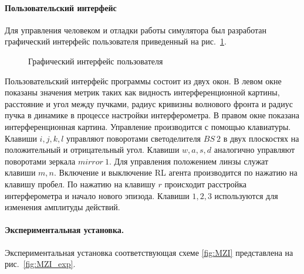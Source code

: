 \paragraph{Пользовательский интерфейс}

Для управления человеком и отладки работы симулятора был разработан графический интерфейс пользователя приведенный на рис.~\ref{fig:gui}. 

\begin{figure}[ht]
\caption{Графический интерфейс пользователя}
\label{fig:gui}
\end{figure}

Пользовательский интерфейс программы состоит из двух окон. В левом окне показаны значения метрик таких как видность интерференционной картины, расстояние и угол между пучками, радиус кривизны волнового фронта и радиус пучка в динамике в процессе настройки интерферометра. В правом окне показана интерференционная картина. Управление производится с помощью клавиатуры. Клавиши $i,j,k,l$ управляют поворотами светоделителя $BS\ 2$ в двух плоскостях на положительный и отрицательный угол. Клавиши $w,a,s,d$ аналогично управляют поворотами зеркала $mirror\ 1$. Для управления положением линзы служат клавиши $m,n$. Включение и выключение RL агента производится по нажатию на клавишу пробел. По нажатию на клавишу $r$ происходит расстройка интерферометра и начало нового эпизода. Клавиши $1,2,3$ используются для изменения амплитуды действий.

\paragraph{Экспериментальная установка.} Экспериментальная установка соответствующая схеме \ref{fig:MZI} представлена на рис.~\ref{fig:MZI_exp}. 

